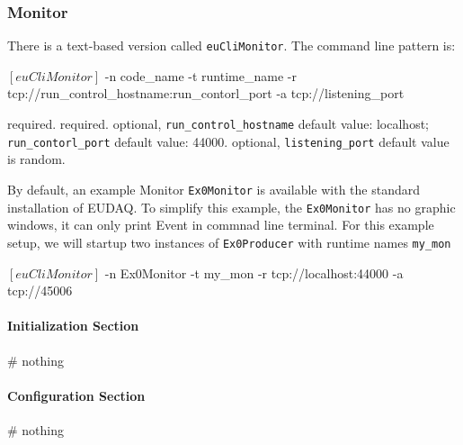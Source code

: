 \subsubsection{Monitor}
\label{sec:onlinemonitor}
There is a text-based version called \texttt{euCliMonitor}.
The command line pattern is:
\begin{listing}[mybash]
$[euCliMonitor]$ -n {code_name} -t {runtime_name} -r tcp://{run_control_hostname}:{run_contorl_port} -a tcp://{listening_port}
\end{listing}
\begin{description}
required.
required.
optional, \texttt{run\_control\_hostname} default value: localhost;  \texttt{run\_contorl\_port}  default value: 44000.
optional, \texttt{listening\_port} default value is random.
\end{description}

By default, an example Monitor \texttt{Ex0Monitor} is available with the standard installation of EUDAQ. To simplify this example, the \texttt{Ex0Monitor} has no graphic windows, it can only print Event in commnad line terminal.
For this example setup, we will startup two instances of \texttt{Ex0Producer} with runtime names \texttt{my\_mon}\\
\begin{listing}[mybash]
$[euCliMonitor]$ -n Ex0Monitor -t my_mon -r tcp://localhost:44000 -a tcp://45006
\end{listing}

\paragraph{Initialization Section}
\begin{listing}
# nothing
\end{listing}

\paragraph{Configuration Section}
\begin{listing}
# nothing
\end{listing}

